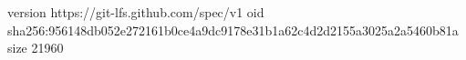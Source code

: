 version https://git-lfs.github.com/spec/v1
oid sha256:956148db052e272161b0ce4a9dc9178e31b1a62c4d2d2155a3025a2a5460b81a
size 21960
